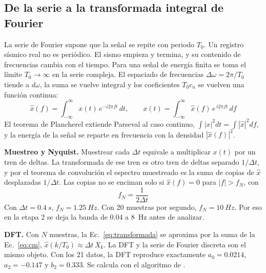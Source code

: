 \documentclass[11pt,letterpaper]{article}
\begin{document}
\subsection{De la serie a la transformada integral de Fourier}
La serie de Fourier supone que la señal se repite con periodo $T_0$. Un registro sísmico real no es periódico. El sismo empieza y termina, y su contenido de frecuencias cambia con el tiempo. Para una señal de energía finita se toma el límite $T_0 \to \infty$ en la serie compleja. El espaciado de frecuencias $\Delta\omega = 2\pi/T_0$ tiende a $d\omega$, la suma se vuelve integral y los coeficientes $T_0 c_n$ se vuelven una función continua:
\begin{equation}
\hat x(f) = \int_{-\infty}^{\infty} x(t)\,e^{-i2\pi ft}\,dt, \qquad x(t) = \int_{-\infty}^{\infty}\hat x(f)\,e^{\,i2\pi ft}\,df
\label{eq:transformada}
\end{equation}
El teorema de Plancherel extiende Parseval al caso continuo, $\int|x|^2dt = \int|\hat x|^2df$, y la energía de la señal se reparte en frecuencia con la densidad $|\hat x(f)|^2$.

\textbf{Muestreo y Nyquist.} Muestrear cada $\Delta t$ equivale a multiplicar $x(t)$ por un tren de deltas. La transformada de ese tren es otro tren de deltas separado $1/\Delta t$, y por el teorema de convolución el espectro muestreado es la suma de copias de $\hat x$ desplazadas $1/\Delta t$. Las copias no se enciman solo si $\hat x(f) = 0$ para $|f| > f_N$, con
\begin{equation}
f_N = \frac{1}{2\Delta t}
\label{eq:nyquist}
\end{equation}
Con $\Delta t = \SI{0.4}{s}$, $f_N = \SI{1.25}{Hz}$. Con 20 muestras por segundo, $f_N = \SI{10}{Hz}$. Por eso en la etapa 2 se deja la banda de 0.04 a \SI{8}{Hz} antes de analizar.

\textbf{DFT.} Con $N$ muestras, la Ec.~\eqref{eq:transformada} se aproxima por la suma de la Ec.~\eqref{eq:cm}, $\hat x(k/T_0) \approx \Delta t\,X_k$. La DFT y la serie de Fourier discreta son el mismo objeto. Con los 21 datos, la DFT reproduce exactamente $a_0 = 0.0214$, $a_2 = -0.147$ y $b_2 = 0.333$. Se calcula con el algoritmo de \textcite{cooley1965}.
\end{document}
